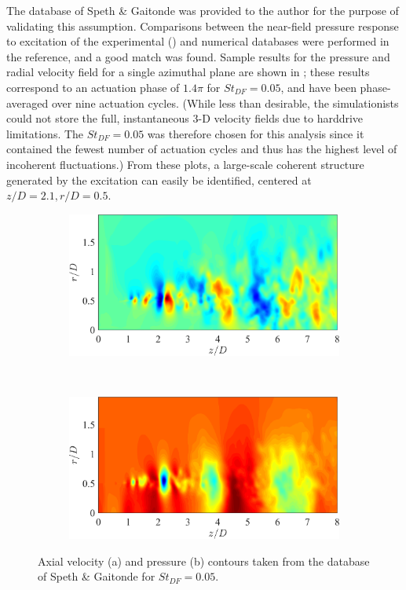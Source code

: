The database of Speth \& Gaitonde \citep{Speth2014} was provided to the author for the purpose of validating this assumption.
Comparisons between the near-field pressure response to excitation of the experimental () and numerical databases were performed in the reference, and a good match was found.
Sample results for the pressure and radial velocity field for a single azimuthal plane are shown in ; these results correspond to an actuation phase of $1.4 \pi$ for $St_{DF} = 0.05$, and have been phase-averaged over nine actuation cycles.
(While less than desirable, the simulationists could not store the full, instantaneous 3-D velocity fields due to harddrive limitations. The $St_{DF} = 0.05$ was therefore chosen for this analysis since it contained the fewest number of actuation cycles and thus has the highest level of incoherent fluctuations.)
From these plots, a large-scale coherent structure generated by the excitation can easily be identified, centered at $z/D = 2.1, r/D = 0.5$.
\begin{figure}
	\centering
	\begin{subfigure}{0.75\textwidth}
		\centering
		\includegraphics[width=0.95\linewidth]{Figures/LES_phavg_streamwise_Ur.png}
		\caption{}
	\end{subfigure}\\
	\begin{subfigure}{0.75\textwidth}
		\centering
		\includegraphics[width=0.95\linewidth]{Figures/LES_phavg_streamwise_p.png}
		\caption{}
	\end{subfigure}
	\caption{Axial velocity (a) and pressure (b) contours taken from the database of Speth \& Gaitonde \citep{Speth2014} for $St_{DF} = 0.05$.}
	\label{fig:LES_streamwise_phavg}
\end{figure}


